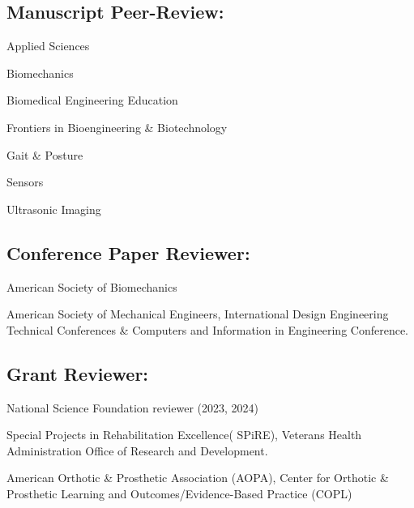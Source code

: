 \documentclass[letterpaper, 10pt]{article}
\begin{document}
\subsection{Manuscript Peer-Review:}
\begin{compactitem} %
    \item Applied Sciences    
    \item Biomechanics
    \item Biomedical Engineering Education
    \item Frontiers in Bioengineering \& Biotechnology
    \item Gait \& Posture
    \item Sensors
    \item Ultrasonic Imaging
\end{compactitem}%

\subsection{Conference Paper Reviewer:}
\begin{compactitem} %
    \item American Society of Biomechanics
    \item American Society of Mechanical Engineers, International Design Engineering Technical Conferences \& Computers and Information in Engineering Conference.
\end{compactitem}%

\subsection{Grant Reviewer:}
\begin{compactitem} %
    \item National Science Foundation reviewer (2023, 2024) %
    \item Special Projects in Rehabilitation Excellence( SPiRE), Veterans Health Administration Office of Research and Development.
    \item American Orthotic \& Prosthetic Association (AOPA), Center for Orthotic \& Prosthetic Learning and Outcomes/Evidence-Based Practice (COPL)
\end{compactitem} %
\end{document}
